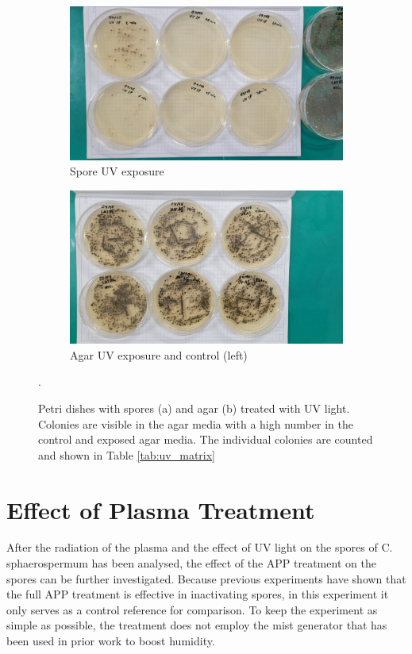 \begin{figure}
    \centering
    \begin{subfigure}[b]{0.8\textwidth}
        \centering
        \includegraphics[width=\textwidth]{images/UV_SP.jpeg}
        \caption{Spore UV exposure}
        \label{fig:uv_a}
    \end{subfigure}
    \vfill
    \begin{subfigure}[b]{.8\textwidth}
        \centering
        \includegraphics[width=\textwidth]{images/UV_AG.jpeg}
        \caption{Agar UV exposure and control (left)}
        \label{fig:uv_b}
    \end{subfigure}
    \caption[Photograph of Petri dishes after treatment]{Petri dishes with spores (a) and agar (b) treated with UV light. Colonies are visible in the agar media with a high number in the control and exposed agar media. The individual colonies are counted and shown in Table \ref{tab:uv_matrix}}. 
    \label{fig:uv_experiment}
\end{figure}


\section{Effect of Plasma Treatment}
After the radiation of the plasma and the effect of UV light on the spores of C. sphaerospermum has been analysed, the effect of the APP treatment on the spores can be further investigated. Because previous experiments \cite{kit} have shown that the full APP treatment is effective in inactivating spores, in this experiment it only serves as a control reference for comparison. To keep the experiment as simple as possible, the treatment does not employ the mist generator that has been used in prior work to boost humidity.


